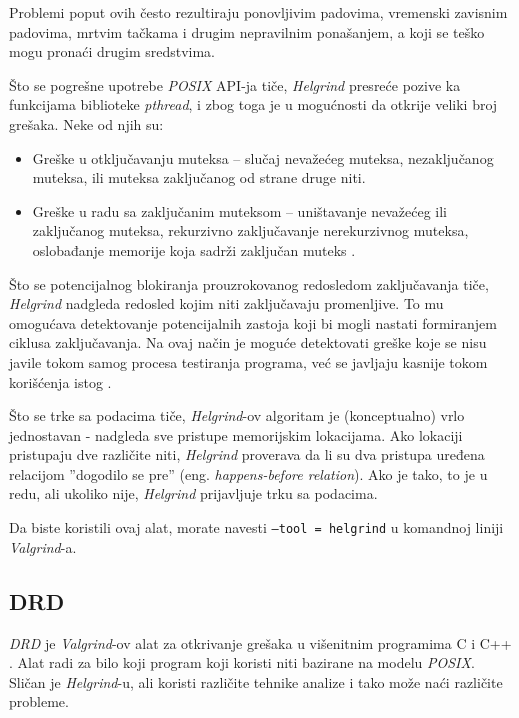 \documentclass[12pt,oneside]{memoir}
\theoremstyle{plain}
\theoremstyle{definition}
\begin{document}
Problemi poput ovih često rezultiraju ponovljivim padovima, vremenski zavisnim padovima, mrtvim tačkama i drugim nepravilnim ponašanjem, a koji se teško mogu pronaći drugim sredstvima.

Što se pogrešne upotrebe \textit{POSIX} API-ja tiče, \textit{Helgrind} presreće pozive ka funkcijama biblioteke \textit{pthread}, i zbog toga je u mogućnosti da otkrije veliki broj grešaka. Neke od njih su: 
\begin{itemize}
\item Greške u otključavanju muteksa – slučaj nevažećeg muteksa, nezaključanog muteksa, ili muteksa zaključanog od strane druge niti.
\item Greške u radu sa zaključanim muteksom – uništavanje nevažećeg ili zaključanog muteksa, rekurzivno zaključavanje nerekurzivnog muteksa, oslobađanje memorije koja sadrži zaključan muteks \cite{Helgrind}.
\end{itemize}

Što se potencijalnog blokiranja prouzrokovanog redosledom zaključavanja tiče, \textit{Helgrind} nadgleda redosled kojim niti zaključavaju promenljive. To mu omogućava detektovanje potencijalnih zastoja koji bi mogli nastati formiranjem ciklusa zaključavanja. Na ovaj način je moguće detektovati greške koje se nisu javile tokom samog procesa testiranja programa, već se javljaju kasnije tokom korišćenja istog \cite{Helgrind}.

Što se trke sa podacima tiče, \textit{Helgrind}-ov algoritam je (konceptualno) vrlo jednostavan - nadgleda sve pristupe memorijskim lokacijama. Ako lokaciji pristupaju dve različite niti, \textit{Helgrind} proverava da li su dva pristupa uređena relacijom ''dogodilo se pre'' (eng. \textit{happens-before relation}). Ako je tako, to je u redu, ali ukoliko nije, \textit{Helgrind} prijavljuje trku sa podacima.

Da biste koristili ovaj alat, morate navesti \texttt{--tool = helgrind} u komandnoj liniji \textit{Valgrind}-a.

\subsection{DRD}
\textit{DRD} je \textit{Valgrind}-ov alat za otkrivanje grešaka u višenitnim programima C i C++ \cite{Drd}. Alat radi za bilo koji program koji koristi niti bazirane na modelu \textit{POSIX}\cite{Drd}. Sličan je \textit{Helgrind}-u, ali koristi različite tehnike analize i tako može naći različite probleme.
\end{document}
